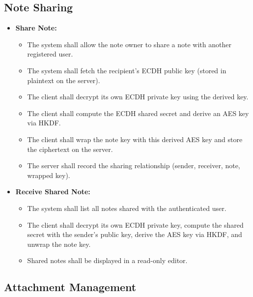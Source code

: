 \subsection{Note Sharing}

\begin{itemize}
    \item \textbf{Share Note:}
    \begin{itemize}
        \item The system shall allow the note owner to share a note with another registered user.
        \item The system shall fetch the recipient's ECDH public key (stored in plaintext on the server).
        \item The client shall decrypt its own ECDH private key using the derived key.
        \item The client shall compute the ECDH shared secret and derive an AES key via HKDF.
        \item The client shall wrap the note key with this derived AES key and store the ciphertext on the server.
        \item The server shall record the sharing relationship (sender, receiver, note, wrapped key).
    \end{itemize}

    \item \textbf{Receive Shared Note:}
    \begin{itemize}
        \item The system shall list all notes shared with the authenticated user.
        \item The client shall decrypt its own ECDH private key, compute the shared secret with the sender's public key, derive the AES key via HKDF, and unwrap the note key.
        \item Shared notes shall be displayed in a read-only editor.
    \end{itemize}
\end{itemize}

\subsection{Attachment Management}

